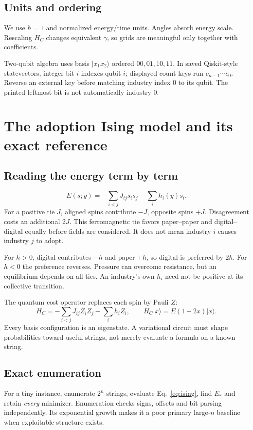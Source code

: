 \documentclass[11pt,letterpaper]{article}
\newcommand{\ket}[1]{\lvert #1\rangle}
\begin{document}
\subsection{Units and ordering}
We use $\hbar=1$ and normalized energy/time units. Angles absorb energy scale. Rescaling $H_C$ changes equivalent $\gamma$, so grids are meaningful only together with coefficients.

Two-qubit algebra uses basis $\ket{x_1x_2}$ ordered $00,01,10,11$. In saved Qiskit-style statevectors, integer bit $i$ indexes qubit $i$; displayed count keys run $c_{n-1}\cdots c_0$. Reverse an external key before matching industry index 0 to its qubit. The printed leftmost bit is not automatically industry 0.
\section{The adoption Ising model and its exact reference}\label{sec:ising}
\subsection{Reading the energy term by term}
\begin{equation}
 E(s;y)=-\sum_{i<j}J_{ij}s_is_j-\sum_i h_i(y)s_i.\label{eq:ising}
\end{equation}
For a positive tie $J$, aligned spins contribute $-J$, opposite spins $+J$. Disagreement costs an additional $2J$. This ferromagnetic tie favors paper--paper and digital--digital equally before fields are considered. It does not mean industry $i$ causes industry $j$ to adopt.

For $h>0$, digital contributes $-h$ and paper $+h$, so digital is preferred by $2h$. For $h<0$ the preference reverses. Pressure can overcome resistance, but an equilibrium depends on all ties. An industry's own $h_i$ need not be positive at its collective transition.

The quantum cost operator replaces each spin by Pauli $Z$:
\begin{equation}
 H_C=-\sum_{i<j}J_{ij}Z_iZ_j-\sum_i h_i Z_i,
 \qquad H_C\ket{x}=E(1-2x)\ket{x}.\label{eq:HC}
\end{equation}
Every basis configuration is an eigenstate. A variational circuit must shape probabilities toward useful strings, not merely evaluate a formula on a known string.

\subsection{Exact enumeration}
For a tiny instance, enumerate $2^n$ strings, evaluate Eq.~\eqref{eq:ising}, find $E_*$ and retain \emph{every} minimizer. Enumeration checks signs, offsets and bit parsing independently. Its exponential growth makes it a poor primary large-$n$ baseline when exploitable structure exists.
\end{document}
